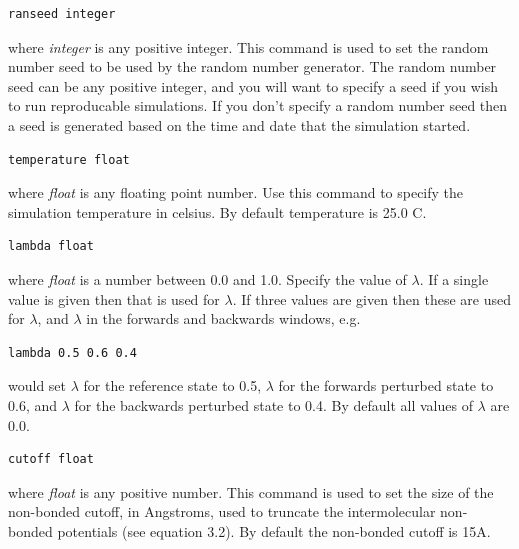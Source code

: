 \documentclass[letterpaper,10pt,english]{sphinxmanual}
\begin{document}
\begin{Verbatim}[commandchars=\\\{\}]
ranseed integer
\end{Verbatim}

where \emph{integer} is any positive integer. This command is used to set the random number seed to be used by the random number generator. The random number seed can be any positive integer, and you will want to specify a seed if you wish to run reproducable simulations. If you don’t specify a random number seed then a seed is generated based on the time and date that the simulation started.

\begin{Verbatim}[commandchars=\\\{\}]
temperature float
\end{Verbatim}

where \emph{float} is any floating point number. Use this command to specify the simulation temperature in celsius. By default temperature is 25.0 C.

\begin{Verbatim}[commandchars=\\\{\}]
lambda float
\end{Verbatim}

where \emph{float} is a number between 0.0 and 1.0. Specify the value of \(\lambda\). If a single value is given then that is used for \(\lambda\). If three values are given then these are used for \(\lambda\), and \(\lambda\) in the forwards and backwards windows, e.g.

\begin{Verbatim}[commandchars=\\\{\}]
lambda 0.5 0.6 0.4
\end{Verbatim}

would set \(\lambda\) for the reference state to 0.5, \(\lambda\) for the forwards perturbed state to 0.6, and \(\lambda\) for the backwards perturbed state to 0.4. By default all values of \(\lambda\) are 0.0.

\begin{Verbatim}[commandchars=\\\{\}]
cutoff float
\end{Verbatim}

where \emph{float} is any positive number. This command is used to set the size of the non-bonded cutoff, in Angstroms, used to truncate the intermolecular non-bonded potentials (see equation 3.2). By default the non-bonded cutoff is 15A.
\end{document}
